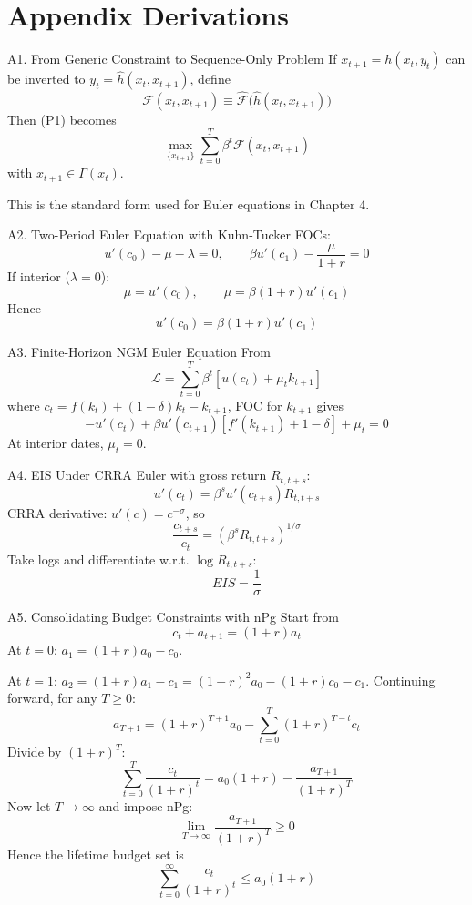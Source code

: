 \documentclass[aspectratio=169,10pt]{beamer}
\newcommand{\backbutton}[1]{\hfill\hyperlink{#1}{\beamerbutton{Back}}}
\begin{document}
\appendix
\section{Appendix Derivations}

\begin{frame}{A1. From Generic Constraint to Sequence-Only Problem}
\hypertarget{a1}{}
If $x_{t+1}=h(x_t,y_t)$ can be inverted to $y_t=\hat{h}(x_t,x_{t+1})$, define
\[
\mathcal{F}(x_t,x_{t+1})\equiv \hat{\mathcal{F}}\big(\hat{h}(x_t,x_{t+1})\big)
\]
Then (P1) becomes
\[
\max_{\{x_{t+1}\}}\sum_{t=0}^{T}\beta^t\mathcal{F}(x_t,x_{t+1})
\]
with $x_{t+1}\in\Gamma(x_t)$.

This is the standard form used for Euler equations in Chapter 4.
\backbutton{m-a1}
\end{frame}

\begin{frame}{A2. Two-Period Euler Equation with Kuhn-Tucker}
\hypertarget{a2}{}
FOCs:
\[
u'(c_0)-\mu-\lambda=0,
\qquad
\beta u'(c_1)-\frac{\mu}{1+r}=0
\]
If interior ($\lambda=0$):
\[
\mu=u'(c_0),\qquad \mu=\beta(1+r)u'(c_1)
\]
Hence
\[
u'(c_0)=\beta(1+r)u'(c_1)
\]
\backbutton{m-a2}
\end{frame}

\begin{frame}{A3. Finite-Horizon NGM Euler Equation}
\hypertarget{a3}{}
From
\[
\mathcal{L}=\sum_{t=0}^{T}\beta^t\left[u(c_t)+\mu_tk_{t+1}\right]
\]
where $c_t=f(k_t)+(1-\delta)k_t-k_{t+1}$, FOC for $k_{t+1}$ gives
\[
-u'(c_t)+\beta u'(c_{t+1})\left[f'(k_{t+1})+1-\delta\right]+\mu_t=0
\]
At interior dates, $\mu_t=0$.
\backbutton{m-a3}
\end{frame}

\begin{frame}{A4. EIS Under CRRA}
\hypertarget{a4}{}
Euler with gross return $R_{t,t+s}$:
\[
u'(c_t)=\beta^s u'(c_{t+s})R_{t,t+s}
\]
CRRA derivative: $u'(c)=c^{-\sigma}$, so
\[
\frac{c_{t+s}}{c_t}=\left(\beta^sR_{t,t+s}\right)^{1/\sigma}
\]
Take logs and differentiate w.r.t. $\log R_{t,t+s}$:
\[
EIS=\frac{1}{\sigma}
\]
\backbutton{m-a4}
\end{frame}

\begin{frame}{A5. Consolidating Budget Constraints with nPg}
\hypertarget{a5}{}
Start from
\[
c_t+a_{t+1}=(1+r)a_t
\]
At $t=0$: $a_1=(1+r)a_0-c_0$.

At $t=1$: $a_2=(1+r)a_1-c_1=(1+r)^2a_0-(1+r)c_0-c_1$. Continuing forward, for any $T\ge 0$:
\[
a_{T+1}=(1+r)^{T+1}a_0-\sum_{t=0}^{T}(1+r)^{T-t}c_t
\]
Divide by $(1+r)^T$:
\[
\sum_{t=0}^{T}\frac{c_t}{(1+r)^t}=a_0(1+r)-\frac{a_{T+1}}{(1+r)^T}
\]
Now let $T\to\infty$ and impose nPg:
\[
\lim_{T\to\infty}\frac{a_{T+1}}{(1+r)^T}\ge 0
\]
Hence the lifetime budget set is
\[
\sum_{t=0}^{\infty}\frac{c_t}{(1+r)^t}\le a_0(1+r)
\]
\backbutton{m-a5}
\end{frame}
\end{document}
